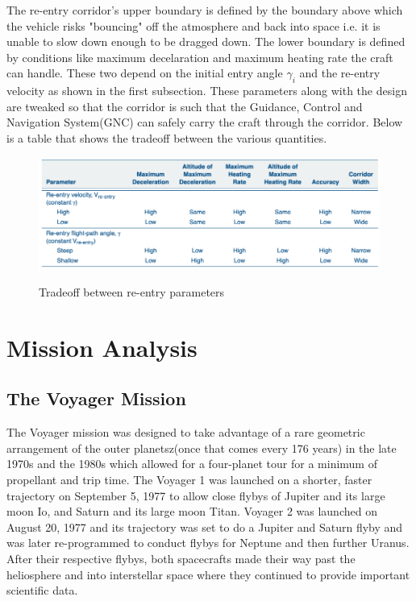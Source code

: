\documentclass[12pt, letterpaper]{article}
\begin{document}
The re-entry corridor's upper boundary is defined by the boundary above which the vehicle risks "bouncing" off the atmosphere and back into space i.e. it is unable to slow down enough to be dragged down. The lower boundary is defined by conditions like maximum decelaration and maximum heating rate the craft can handle. These two depend on the initial entry angle $\gamma_i$ and the re-entry velocity as shown in the first subsection. These parameters along with the design are tweaked so that the corridor is such that the Guidance, Control and Navigation System(GNC) can safely carry the craft through the corridor. Below is a table that shows the tradeoff between the various quantities.

\begin{figure}[ht]
	\centering
    \includegraphics[width=\textwidth]{tradeoff}
    \label{fig:tradeoff}
    \caption{Tradeoff between re-entry parameters}
\end{figure}
 
 \newpage

\section{Mission Analysis}
\subsection{The Voyager Mission}
The Voyager mission was designed to take advantage of a rare geometric arrangement of the outer planetsz(once that comes every 176 years) in the late 1970s and the 1980s which allowed for a four-planet tour for a minimum of propellant and trip time. The Voyager 1 was launched on a shorter, faster trajectory on September 5, 1977 to allow  close flybys of Jupiter and its large moon Io, and Saturn and its large moon Titan. Voyager 2 was launched on August 20, 1977 and its trajectory was set to do a Jupiter and Saturn flyby and was later re-programmed to conduct flybys for Neptune and then further Uranus. After their respective flybys, both spacecrafts made their way past the heliosphere and into interstellar space where they continued to provide important scientific data. 
\end{document}
